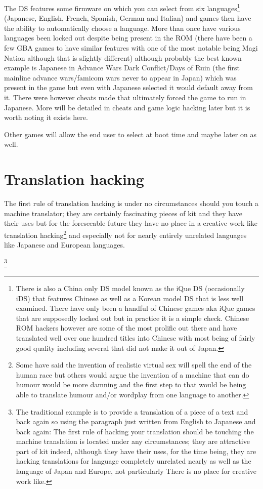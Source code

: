 \documentclass[
]{book}
\begin{document}
The DS features some firmware on which you can select from six languages\footnote{There is also a China only DS model known as the iQue DS (occasionally iDS) that features Chinese as well as a Korean model DS that is less well examined. There have only been a handful of Chinese games aka iQue games that are supposedly locked out but in practice it is a simple check. Chinese ROM hackers however are some of the most prolific out there and have translated well over one hundred titles into Chinese with most being of fairly good quality including several that did not make it out of Japan.} (Japanese, English, French, Spanish, German and Italian) and games then have the ability to automatically choose a language. More than once have various languages been locked out despite being present in the ROM (there have been a few GBA games to have similar features with one of the most notable being Magi Nation although that is slightly different) although probably the best known example is Japanese in Advance Wars Dark Conflict/Days of Ruin (the first mainline advance wars/famicom wars never to appear in Japan) which was present in the game but even with Japanese selected it would default away from it. There were however cheats made that ultimately forced the game to run in Japanese. More will be detailed in cheats and game logic hacking later but it is worth noting it exists here.

Other games will allow the end user to select at boot time and maybe later on as well.

\hypertarget{translation-hacking}{%
\section{Translation hacking}\label{translation-hacking}}

The first rule of translation hacking is under no circumstances should you touch a machine translator; they are certainly fascinating pieces of kit and they have their uses but for the foreseeable future they have no place in a creative work like translation hacking\footnote{Some have said the invention of realistic virtual sex will spell the end of the human race but others would argue the invention of a machine that can do humour would be more damning and the first step to that would be being able to translate humour and/or wordplay from one language to another.} and especially not for nearly entirely unrelated languages like Japanese and European languages.

\footnote{The traditional example is to provide a translation of a piece of a text and back again so using the paragraph just written from English to Japanese and back again: The first rule of hacking your translation should be touching the machine translation is located under any circumstances; they are attractive part of kit indeed, although they have their uses, for the time being, they are hacking translations for language completely unrelated nearly as well as the language of Japan and Europe, not particularly There is no place for creative work like.}
\end{document}
